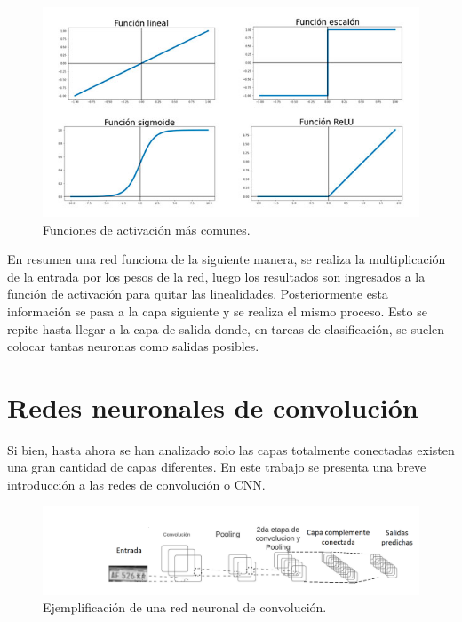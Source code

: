 \begin{figure}[bth]
    \centering
    \includegraphics[width=1\textwidth]{imgs/Funciones-de-activacion.jpg}
    \caption{Funciones de activación más comunes.}
    \label{fig:funciones-activacion}
\end{figure}

En resumen una red funciona de la siguiente manera, se realiza la multiplicación de la entrada por los pesos de la red, luego los resultados son ingresados a la función de activación para quitar las linealidades. Posteriormente esta información se pasa a la capa siguiente y se realiza el mismo proceso. Esto se repite hasta llegar a la capa de salida donde, en tareas de clasificación, se suelen colocar tantas neuronas como salidas posibles.

\section{Redes neuronales de convolución}

Si bien, hasta ahora se han analizado solo las capas totalmente conectadas existen una gran cantidad de capas diferentes. En este trabajo se presenta una breve introducción a las redes de convolución o CNN.

\begin{figure}[bth]
    \centering
    \includegraphics[width=1\textwidth]{imgs/CNN-completa.png}
    \caption{Ejemplificación de una red neuronal de convolución.}
    \label{fig:esquema-CNN}
\end{figure}

